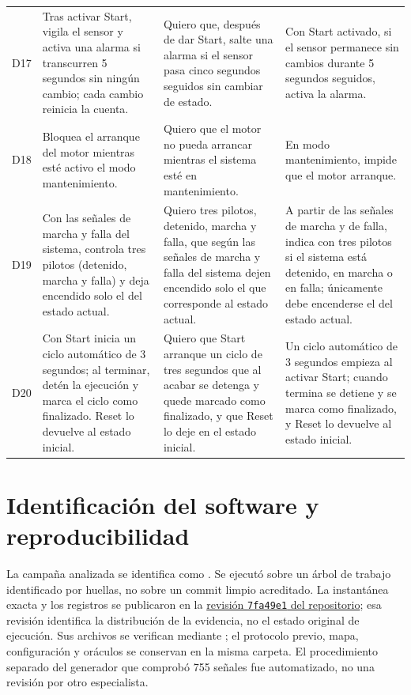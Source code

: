 \documentclass[a4paper,fleqn]{cas-dc}
\begin{document}
\begin{table}[!ht]
\begin{tabularx}{\textwidth}{@{}l >{\raggedright\arraybackslash}X >{\raggedright\arraybackslash}X >{\raggedright\arraybackslash}X@{}}
\addlinespace[2pt]
D17 & Tras activar Start, vigila el sensor y activa una alarma si transcurren 5 segundos sin ningún cambio; cada cambio reinicia la cuenta. & Quiero que, después de dar Start, salte una alarma si el sensor pasa cinco segundos seguidos sin cambiar de estado. & Con Start activado, si el sensor permanece sin cambios durante 5 segundos seguidos, activa la alarma.\\
\addlinespace[2pt]
D18 & Bloquea el arranque del motor mientras esté activo el modo mantenimiento. & Quiero que el motor no pueda arrancar mientras el sistema esté en mantenimiento. & En modo mantenimiento, impide que el motor arranque.\\
\addlinespace[2pt]
D19 & Con las señales de marcha y falla del sistema, controla tres pilotos (detenido, marcha y falla) y deja encendido solo el del estado actual. & Quiero tres pilotos, detenido, marcha y falla, que según las señales de marcha y falla del sistema dejen encendido solo el que corresponde al estado actual. & A partir de las señales de marcha y de falla, indica con tres pilotos si el sistema está detenido, en marcha o en falla; únicamente debe encenderse el del estado actual.\\
\addlinespace[2pt]
D20 & Con Start inicia un ciclo automático de 3 segundos; al terminar, detén la ejecución y marca el ciclo como finalizado. Reset lo devuelve al estado inicial. & Quiero que Start arranque un ciclo de tres segundos que al acabar se detenga y quede marcado como finalizado, y que Reset lo deje en el estado inicial. & Un ciclo automático de 3 segundos empieza al activar Start; cuando termina se detiene y se marca como finalizado, y Reset lo devuelve al estado inicial.\\
\bottomrule
\end{tabularx}
\end{table}

\FloatBarrier
\section{Identificación del software y reproducibilidad}
\label{app:reproducibilidad}
La campaña analizada se identifica como . Se ejecutó sobre un árbol de trabajo identificado por huellas, no sobre un commit limpio acreditado. La instantánea exacta  y los registros se publicaron en la \href{https://github.com/HenryFerOZ-2000/voz-llm-plc-agent/tree/7fa49e1503408b7cbbc1943b04ce1350d42e58a3/data/thesis_campaigns/THESIS_DISCRETE_LLM_180_20261026_R2}{revisión \texttt{7fa49e1} del repositorio}; esa revisión identifica la distribución de la evidencia, no el estado original de ejecución. Sus archivos se verifican mediante ; el protocolo previo, mapa, configuración y oráculos se conservan en la misma carpeta. El procedimiento separado del generador que comprobó 755 señales fue automatizado, no una revisión por otro especialista.
\end{document}
